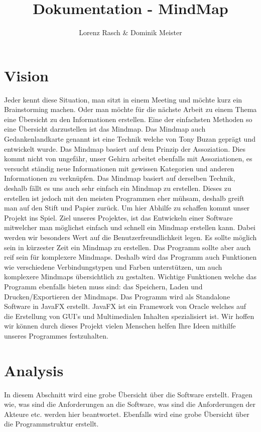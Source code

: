 \documentclass[a4paper,parskip]{scrartcl}
\title{Dokumentation - MindMap}
\author{Lorenz Rasch \& Dominik Meister}
\begin{document}
\maketitle
\tableofcontents
\pagebreak
\section{Vision}
Jeder kennt diese Situation, man sitzt in einem Meeting und möchte kurz ein Brainstorming machen. Oder man
möchte für die nächste Arbeit zu einem Thema eine Übersicht zu den Informationen erstellen. Eine der einfachsten Methoden so eine Übersicht darzustellen ist das Mindmap. Das Mindmap auch Gedankenlandkarte genannt ist eine Technik welche von Tony Buzan geprägt und entwickelt wurde. Das Mindmap basiert auf dem Prinzip der Assoziation. Dies kommt nicht von ungefähr, unser Gehirn arbeitet ebenfalls mit Assoziationen, es versucht ständig neue Informationen mit gewissen Kategorien und anderen Informationen zu verknüpfen. Das Mindmap basiert auf derselben Technik, deshalb fällt es uns auch sehr einfach ein Mindmap zu erstellen.
Dieses zu erstellen ist jedoch mit den meisten Programmen eher mühsam, deshalb greift man auf den Stift und Papier zurück. Um hier Abhilfe zu schaffen kommt unser Projekt ins Spiel. Ziel unseres Projektes, ist das Entwickeln einer Software mitwelcher man möglichst einfach und schnell ein Mindmap erstellen kann. 
Dabei werden wir besonders Wert auf die Benutzerfreundlichkeit legen. Es sollte 
möglich sein in kürzester Zeit ein Mindmap zu erstellen. Das Programm sollte aber auch reif sein für komplexere Mindmaps. Deshalb wird das Programm auch Funktionen wie verschiedene Verbindungstypen und Farben unterstützen, um auch komplexere Mindmaps übersichtlich zu gestalten. 
Wichtige Funktionen welche das Programm ebenfalls bieten muss sind: das Speichern, Laden und Drucken/Exportieren der Mindmaps. 
Das Programm wird als Standalone Software in JavaFX erstellt. JavaFX ist ein Framework von Oracle welches auf die Erstellung von GUI's und Multimedialen Inhalten spezialisiert ist.
Wir hoffen wir können durch dieses Projekt vielen Menschen helfen Ihre Ideen mithilfe unseres Programmes
festzuhalten. 
\section{Analysis}
In diesem Abschnitt wird eine grobe Übersicht über die Software erstellt. Fragen wie, was sind die Anforderungen an die Software, was sind die Anforderungen der Akteure etc. werden hier beantwortet. Ebenfalls wird eine grobe Übersicht über die Programmstruktur erstellt.
\end{document}
